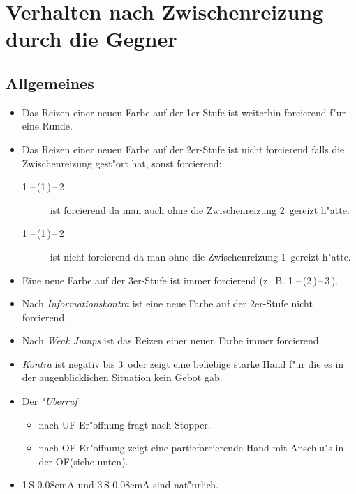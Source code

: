\documentclass[11pt,german,twocolumn]{scrartcl}
\def\pik{\nobreak\,\Sp\xspace}
\def\coe{\nobreak\,\He\xspace}
\def\kar{\nobreak\,\Di\xspace}
\def\tre{\nobreak\,\Cl\xspace}
\def\ufa{\nobreak\textsf{UF}\xspace}
\def\ofa{\nobreak\textsf{OF}\xspace}
\def\sa{\nobreak\textsf{S\kern-0.08emA}\xspace}
\def\SA{\nobreak\,\sa}
\def\sep{\,--\,}
\newcommand{\conv}[1]{\emph{#1}}
\begin{document}
\newpage
\section{Verhalten nach Zwischenreizung durch die
  Gegner\label{zwischenreizung}}

\subsection{Allgemeines}
\begin{itemize}
\item Das Reizen einer neuen Farbe auf der 1er-Stufe ist weiterhin
forcierend f"ur eine Runde.
%
\item Das Reizen einer neuen Farbe auf der 2er-Stufe ist nicht forcierend
falls die Zwischenreizung gest"ort hat, sonst forcierend:
\begin{description}
\item[1\coe{}\sep(1\pik){}\sep2\kar] ist forcierend da man auch
ohne die Zwischenreizung 2\kar gereizt h"atte.
\item[1\tre{}\sep(1\pik){}\sep2\coe] ist nicht forcierend da man ohne die
  Zwischenreizung 1\coe gereizt h"atte.
\end{description}
%
\item Eine neue Farbe auf der 3er-Stufe ist immer forcierend
  (z.~B. 1\pik{}\sep(2\kar){}\sep3\tre).
\item Nach \conv{Informationskontra} ist eine neue Farbe auf der 2er-Stufe
  nicht forcierend.
\item Nach \conv{Weak Jumps} ist das Reizen einer neuen Farbe immer
  forcierend.
\item \conv{Kontra} ist negativ bis 3\coe oder zeigt eine beliebige
  starke Hand f"ur die es in der augenblicklichen Situation kein Gebot
  gab.
\item Der \conv{"Uberruf}
  \begin{itemize}
    \item nach \ufa-Er"offnung fragt nach Stopper.
    \item nach \ofa-Er"offnung zeigt eine partieforcierende Hand mit
      Anschlu"s in der \ofa (siehe unten).
    \end{itemize}
\item 1\SA und 3\SA sind nat"urlich.
\end{itemize}
\end{document}

